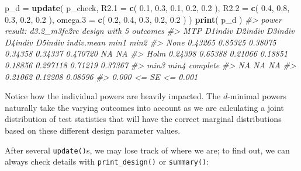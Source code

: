 \documentclass[
]{article}
\newenvironment{Shaded}{\begin{snugshade}}{\end{snugshade}}
\newcommand{\CommentTok}[1]{\textcolor[rgb]{0.56,0.35,0.01}{\textit{#1}}}
\newcommand{\DataTypeTok}[1]{\textcolor[rgb]{0.13,0.29,0.53}{#1}}
\newcommand{\FloatTok}[1]{\textcolor[rgb]{0.00,0.00,0.81}{#1}}
\newcommand{\KeywordTok}[1]{\textcolor[rgb]{0.13,0.29,0.53}{\textbf{#1}}}
\newcommand{\NormalTok}[1]{#1}
\newcommand{\StringTok}[1]{\textcolor[rgb]{0.31,0.60,0.02}{#1}}
\begin{document}
\begin{Shaded}
\begin{Highlighting}[]
\NormalTok{p\_d =}\StringTok{ }\KeywordTok{update}\NormalTok{( p\_check,}
            \DataTypeTok{R2.1 =} \KeywordTok{c}\NormalTok{( }\FloatTok{0.1}\NormalTok{, }\FloatTok{0.3}\NormalTok{, }\FloatTok{0.1}\NormalTok{, }\FloatTok{0.2}\NormalTok{, }\FloatTok{0.2}\NormalTok{ ),}
            \DataTypeTok{R2.2 =} \KeywordTok{c}\NormalTok{( }\FloatTok{0.4}\NormalTok{, }\FloatTok{0.8}\NormalTok{, }\FloatTok{0.3}\NormalTok{, }\FloatTok{0.2}\NormalTok{, }\FloatTok{0.2}\NormalTok{ ),}
            \DataTypeTok{omega.3 =} \KeywordTok{c}\NormalTok{( }\FloatTok{0.2}\NormalTok{, }\FloatTok{0.4}\NormalTok{, }\FloatTok{0.3}\NormalTok{, }\FloatTok{0.2}\NormalTok{, }\FloatTok{0.2}\NormalTok{ ) )}
\KeywordTok{print}\NormalTok{( p\_d )}
\CommentTok{\#\textgreater{} power result: d3.2\_m3fc2rc design with 5 outcomes}
\CommentTok{\#\textgreater{}   MTP D1indiv D2indiv D3indiv D4indiv D5indiv indiv.mean    min1    min2}
\CommentTok{\#\textgreater{}  None 0.43265 0.85325 0.38075 0.34358 0.34337   0.470720      NA      NA}
\CommentTok{\#\textgreater{}  Holm 0.24398 0.65388 0.21066 0.18851 0.18856   0.297118 0.71219 0.37367}
\CommentTok{\#\textgreater{}     min3    min4 complete}
\CommentTok{\#\textgreater{}       NA      NA       NA}
\CommentTok{\#\textgreater{}  0.21062 0.12208  0.08596}
\CommentTok{\#\textgreater{}  0.000 \textless{}= SE \textless{}= 0.001}
\end{Highlighting}
\end{Shaded}

Notice how the individual powers are heavily impacted. The \(d\)-minimal
powers naturally take the varying outcomes into account as we are
calculating a joint distribution of test statistics that will have the
correct marginal distributions based on these different design parameter
values.

After several \texttt{update()}s, we may lose track of where we are; to
find out, we can always check details with \texttt{print\_design()} or
\texttt{summary()}:
\end{document}

